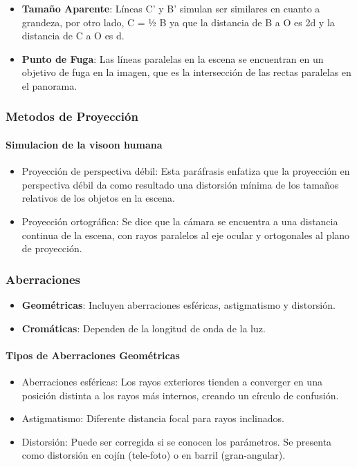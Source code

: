 \begin{itemize}
	\item \textbf{Tamaño Aparente}: Líneas C' y B' simulan ser similares en cuanto a grandeza, por otro lado, C = ½ B ya que la distancia de B a O es 2d y la distancia de C a O es d.
	\item \textbf{Punto de Fuga}: Las líneas paralelas en la escena se encuentran en un objetivo de fuga en la imagen, que es la intersección de las rectas paralelas en el panorama.
\end{itemize}


\subsubsection{Metodos de Proyección}

\paragraph{Simulacion de la visoon humana }

\begin{itemize}
	\item Proyección de perspectiva débil: Esta paráfrasis enfatiza que la proyección en perspectiva débil da como resultado una distorsión mínima de los tamaños relativos de los objetos en la escena.
	\item Proyección ortográfica: Se dice que la cámara se encuentra a una distancia continua de la escena, con rayos paralelos al eje ocular y ortogonales al plano de proyección.
\end{itemize}


\subsubsection{Aberraciones}

\begin{itemize}
	\item \textbf{Geométricas}: Incluyen aberraciones esféricas, astigmatismo y distorsión.
	\item \textbf{Cromáticas}: Dependen de la longitud de onda de la luz.
\end{itemize}

\paragraph{Tipos de Aberraciones Geométricas}

\begin{itemize}
	\item Aberraciones esféricas: Los rayos exteriores tienden a converger en una posición distinta a los rayos más internos, creando un círculo de confusión.
	\item Astigmatismo: Diferente distancia focal para rayos inclinados.
	\item Distorsión: Puede ser corregida si se conocen los parámetros. Se presenta como distorsión en cojín (tele-foto) o en barril (gran-angular).
\end{itemize}

